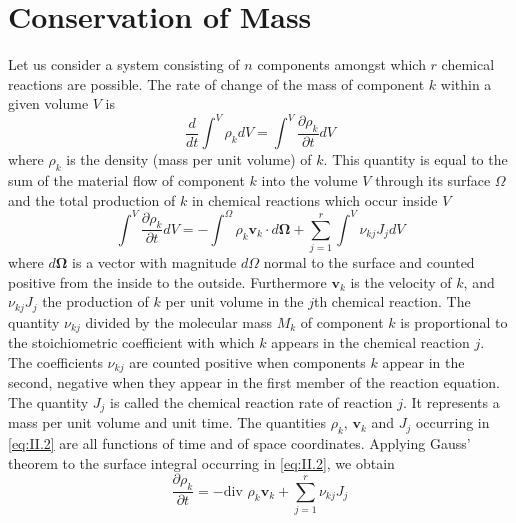\section{Conservation of Mass}
Let us consider a system consisting of $n$ components amongst which $r$
chemical reactions are possible. The rate of change of the mass of component $k$ within a given volume $V$ is
\begin{equation}
\frac{d}{dt} \int^V \rho_k dV = \int^V \frac{\partial \rho_k}{\partial t} dV
    \label{eq:II.1}
\end{equation}
where $\rho_k$ is the density (mass per unit volume) of $k$. This quantity is equal to the sum of the material flow of component $k$ into the volume $V$ through its surface $\Omega$ and the total production of $k$ in chemical reactions which occur inside $V$
\begin{equation}
\int^V \frac{\partial \rho_k}{\partial t} dV = - \int^{\Omega} \rho_k \bm{v}_k \cdot d \bm{\Omega} + \sum_{j=1}^{r} \int^V \nu_{kj}J_j dV
    \label{eq:II.2}
\end{equation}
where $d \bm{\Omega}$ is a vector with magnitude $d \Omega$ normal to the surface and counted positive from the inside to the outside. Furthermore $\bm{v}_k$ is the velocity of $k$, and $\nu_{kj}J_j$ the production of $k$ per unit volume in the $j$th chemical reaction. The quantity $\nu_{kj}$ divided by the molecular mass $M_k$ of component $k$ is proportional to the stoichiometric coefficient with which $k$ appears in the chemical reaction $j$. The coefficients $\nu_{kj}$ are
counted positive when components $k$ appear in the second, negative
when they appear in the first member of the reaction equation. The
quantity $J_j$ is called the chemical reaction rate of reaction $j$. It represents a mass per unit volume and unit time. The quantities $\rho_k$, $\bm{v}_k$ and $J_j$ occurring in \eqref{eq:II.2} are all functions of time and of space coordinates. Applying Gauss' theorem to the surface integral occurring in \eqref{eq:II.2}, we obtain
\begin{equation}
\frac{\partial \rho_k}{\partial t} = - \textrm{div } \rho_k \bm{v}_k
+ \sum_{j=1}^{r} \nu_{kj} J_j
    \label{eq:II.3}
\end{equation}

